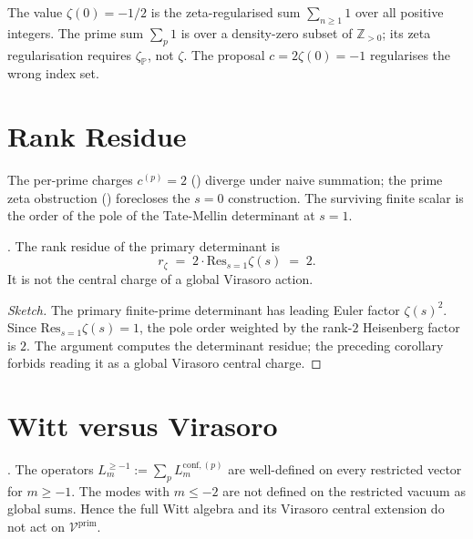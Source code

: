 \begin{remark}
The value \(\zeta(0)=-1/2\) is the zeta-regularised sum
\(\sum_{n\geq 1}1\) over all positive integers.
The prime sum \(\sum_p 1\) is over a density-zero subset of
\(\mathbb{Z}_{>0}\); its zeta regularisation requires \(\zeta_{\mathbb{P}}\),
not \(\zeta\). The proposal \(c=2\zeta(0)=-1\) regularises the wrong
index set.
\end{remark}

\section{Rank Residue}
\label{v4-arith:pol:c-as-residue}

The per-prime charges \(c^{(p)}=2\) () diverge
under naive summation; the prime zeta obstruction ()
forecloses the \(s=0\) construction.
The surviving finite scalar is the order of the pole of the
Tate-Mellin determinant at \(s=1\).

\begin{theorem}
\label{v4-arith:thm:regularised-c}
\ClaimStatusProvedHere. The rank residue of the primary determinant is
\begin{equation}
r_{\zeta}\;=\;2\cdot\mathrm{Res}_{s=1}\zeta(s)\;=\;2.
\end{equation}
It is not the central charge of a global Virasoro action.
\end{theorem}

\begin{proof}[Sketch]
The primary finite-prime determinant has leading Euler factor
\(\zeta(s)^{2}\). Since \(\mathrm{Res}_{s=1}\zeta(s)=1\), the pole
order weighted by the rank-\(2\) Heisenberg factor is \(2\). The
argument computes the determinant residue; the preceding corollary
forbids reading it as a global Virasoro central charge.
\end{proof}

\section{Witt versus Virasoro}
\label{v4-arith:pol:witt-virasoro}

\begin{theorem}
\label{v4-arith:thm:witt-virasoro}
\ClaimStatusProvedHere. The operators
\(L_{m}^{\geq -1}:=\sum_{p}L_{m}^{\mathrm{conf},(p)}\) are
well-defined on every restricted vector for \(m\geq -1\). The modes
with \(m\leq -2\) are not defined on the restricted vacuum as global
sums. Hence the full Witt algebra and its Virasoro central extension
do not act on \(\mathcal{V}^{\mathrm{prim}}\).
\end{theorem}

